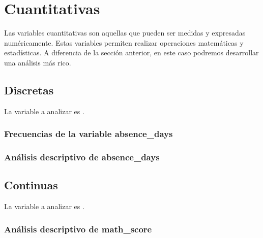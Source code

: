 \section{Cuantitativas}
Las variables cuantitativas son aquellas que pueden ser medidas y expresadas numéricamente. Estas
variables permiten realizar operaciones matemáticas y estadísticas. A diferencia de la sección
anterior, en este caso podremos desarrollar una análisis más rico.

\subsection{Discretas}
La variable a analizar es .

\subsubsection{Frecuencias de la variable absence\_days}


\subsubsection{Análisis descriptivo de absence\_days}






\subsection{Continuas}
La variable a analizar es .

\subsubsection{Análisis descriptivo de math\_score}


